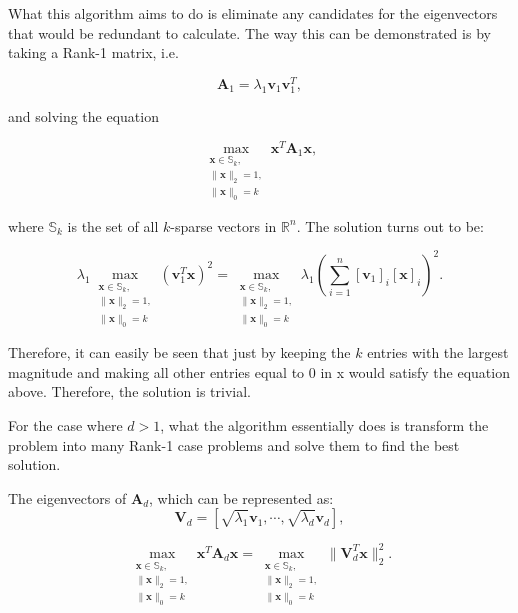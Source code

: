 \documentclass[11pt,a4paper]{article}
\begin{document}
What this algorithm aims to do is eliminate any candidates for the eigenvectors that would be redundant to calculate. The way this can be demonstrated is by taking a Rank-1 matrix, i.e.

\begin{equation*}
\mathbf{A}_1 = \lambda_1 \mathbf{v}_1 \mathbf{v}_1^T,
\end{equation*}

and solving the equation

\begin{equation*}
\max_{\substack{\mathbf{x} \in\mathbb{S}_k, \\ \|\mathbf{x}\|_2 = 1, \\ \|\mathbf{x}\|_0 = k}} \mathbf{x}^T\mathbf{A}_1\mathbf{x},
\end{equation*}

where $\mathbb{S}_k$ is the set of all $k$-sparse vectors in $\mathbb{R}^n$. The solution turns out to be:

\begin{equation*}
\lambda_1\max_{\substack{\mathbf{x} \in\mathbb{S}_k, \\ \|\mathbf{x}\|_2 = 1, \\ \|\mathbf{x}\|_0 = k}} \left(\mathbf{v}_1^T \mathbf{x}\right)^2 = \max_{\substack{\mathbf{x} \in\mathbb{S}_k, \\ \|\mathbf{x}\|_2 = 1, \\ \|\mathbf{x}\|_0 = k}} \lambda_1\left( \sum_{i = 1}^n [\mathbf{v}_{1}]_i [\mathbf{x}]_i\right)^2.
\end{equation*}

Therefore, it can easily be seen that just by keeping the $k$ entries with the largest magnitude and making all other entries equal to 0 in x would satisfy the equation above. Therefore, the solution is trivial. 

For the case where $d > 1$, what the algorithm essentially does is transform the problem into many Rank-1 case problems and solve them to find the best solution.

The eigenvectors of $\mathbf{A}_d$, which can be represented as:
\begin{equation*}
\mathbf{V}_d = [\sqrt{\lambda_1}\mathbf{v}_1, \cdots, \sqrt{\lambda_d}\mathbf{v}_d],
\end{equation*}

\begin{equation*}
\max_{\substack{\mathbf{x} \in\mathbb{S}_k, \\ \|\mathbf{x}\|_2 = 1, \\ \|\mathbf{x}\|_0 = k}}  \mathbf{x}^T\mathbf{A}_d\mathbf{x} = \max_{\substack{\mathbf{x} \in\mathbb{S}_k, \\ \|\mathbf{x}\|_2 = 1, \\ \|\mathbf{x}\|_0 = k}} \|\mathbf{V}_d^T\mathbf{x}\|_2^2.
\end{equation*}
\end{document}
